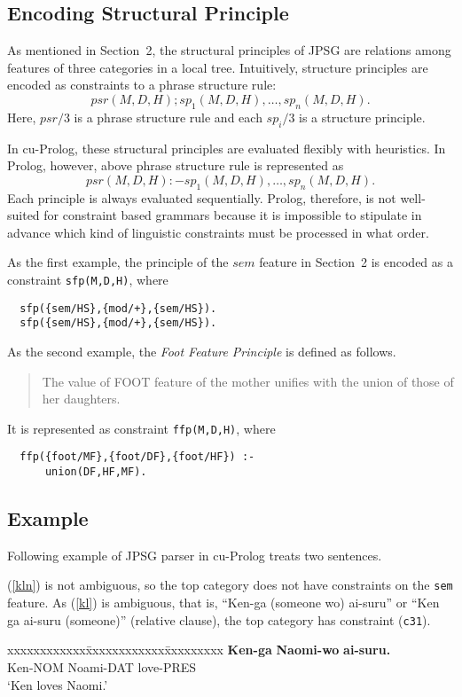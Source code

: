 \subsection{Encoding Structural Principle}
As mentioned in Section~2, the
structural principles of JPSG are
relations among features of three categories in a local tree.
Intuitively, structure principles are encoded as constraints to a
phrase structure rule: 
\[
psr(M,D,H); sp_1(M,D,H), \ldots, sp_n(M,D,H).
\]
Here, $psr/3$ is a phrase structure rule and each $sp_i/3$ is a
structure principle.

In cu-Prolog, these structural principles are evaluated flexibly with
heuristics. In Prolog, however, above phrase structure rule is
represented as 
\[
psr(M,D,H):-sp_1(M,D,H), \ldots, sp_n(M,D,H).
\]
Each principle is always evaluated sequentially. Prolog, therefore, is
not well-suited for constraint based grammars because it is impossible
to stipulate in advance which kind of linguistic constraints must be
processed in what order.

As the first example, the principle of the $sem$ feature in Section~2 is
encoded as a constraint {\tt sfp(M,D,H)}, where
\begin{verbatim}
  sfp({sem/HS},{mod/+},{sem/HS}).
  sfp({sem/HS},{mod/+},{sem/HS}).
\end{verbatim}

As the second example, the {\em Foot Feature Principle} is defined as
follows\cite{gun:jpsg}.
\begin{quote}
	The value of FOOT feature of the mother unifies with the union
of those of her daughters.
\end{quote}
It is represented as constraint {\tt ffp(M,D,H)}, where
\begin{verbatim}
  ffp({foot/MF},{foot/DF},{foot/HF}) :-
      union(DF,HF,MF).
\end{verbatim}

\subsection{Example}
Following example of JPSG parser in cu-Prolog treats two sentences.

(\ref{kln}) is not ambiguous, so the top category does not have
constraints on the {\tt sem} feature.
As (\ref{kl}) is ambiguous, that is, ``Ken-ga (someone wo)
ai-suru'' or ``Ken ga ai-suru (someone)'' (relative clause), 
the top category has constraint ({\tt c31}).

\begin{tabbing}
xxxxxxxxxxxx\=xxxxxxxxxxxx\=xxxxxxxxx\kill
{\bf Ken-ga} \> {\bf Naomi-wo} \> {\bf ai-suru.}\\
{\sf Ken-NOM} \> {\sf Noami-DAT} \> {\sf love-PRES}\\
`Ken loves Naomi.'
\end{tabbing}

